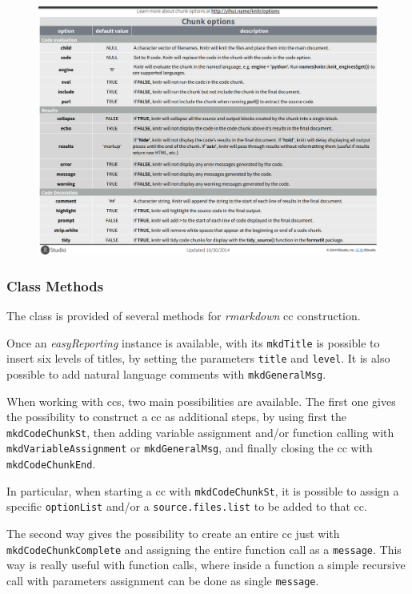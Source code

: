 \begin{figure}[H]
\includegraphics[width=\textwidth,height=\textheight,keepaspectratio]{img/rr/knitropts.png}
\caption[knitr options]{}
\label{fig:knitropts}
\centering
\end{figure}


\subsubsection{Class Methods}

The class is provided of several methods for \textit{rmarkdown} \gls{cc} construction.

Once an \textit{easyReporting} instance is available, with its \lstinline!mkdTitle! is possible to insert six levels of titles, by setting the parameters \lstinline!title! and \lstinline!level!.
It is also possible to add natural language comments with \lstinline!mkdGeneralMsg!.

When working with \glspl{cc}, two main possibilities are available.
The first one gives the possibility to construct a \gls{cc} as additional steps, by using first the \lstinline!mkdCodeChunkSt!, then adding variable assignment and/or function calling with \lstinline!mkdVariableAssignment! or \lstinline!mkdGeneralMsg!, and finally closing the \gls{cc} with \lstinline!mkdCodeChunkEnd!.

In particular, when starting a \gls{cc} with \lstinline!mkdCodeChunkSt!, it is possible to assign a specific \lstinline!optionList! and/or a \lstinline!source.files.list! to be added to that \gls{cc}.

The second way gives the possibility to create an entire \gls{cc} just with \lstinline!mkdCodeChunkComplete! and assigning the entire function call as a \lstinline!message!.
This way is really useful with function calls, where inside a function a simple recursive call with parameters assignment can be done as single \lstinline!message!.



